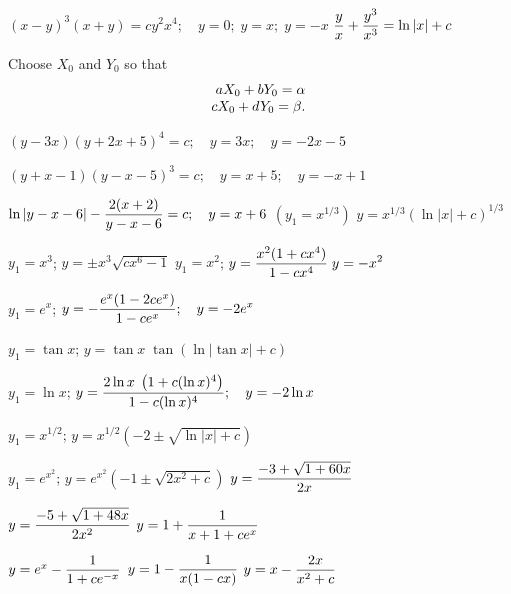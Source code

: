  $(x-y)^{3}(x+y)=cy^{2}x^{4};\quad y=0;\;y=x;\;y=-x$
$\displaystyle{\frac{y}{x}+\frac{y^{3}}{x^{3}}}=\ln|x|+c$

Choose $X_{0}$ and $Y_{0}$ so that
$$
\begin{array}[t]{@{}r@{\,}l}
aX_{0}+bY_{0}=\alpha\\
cX_{0}+dY_{0}=\beta.
\end{array}
$$

$(y-3x)(y+2x+5)^{4}=c;\quad y=3x;\quad y=-2x-5$

$(y+x-1)(y-x-5)^{3}=c;\quad y=x+5;\quad y=-x+1$

$\ln|y-x-6|-\displaystyle\frac{2(x+2)}{y-x-6}=c;\quad y=x+6$
 $(y_{1}=x^{1/3})$ $y=x^{1/3}(\ln|x|+c)^{1/3}$

 $y_{1}=x^{3}$;   $y=\pm x^{3}\sqrt{cx^{6}-1}$
 $y_{1}=x^{2}$;   $y=\displaystyle\frac{x^{2}(1+cx^{4})}{1-cx^{4}}\;
y=-x^{2}$

 $y_{1}=e^{x}$;
$y=-\displaystyle\frac{e^{x}(1-2ce^{x})}{1-ce^{x}};\quad y=-2e^{x}$

 $y_{1}=\tan x$;   $y=\tan x\;\tan(\ln|\tan x|+c)$

 $y_{1}=\ln x$;   $y=\displaystyle\frac{2\ln x\;\left(1+c(\ln
x)^{4}\right)}{1-c(\ln x)^{4}};\quad y=-2\ln x$

 $y_{1}=x^{1/2}$;
$y=x^{1/2}(-2\pm\sqrt{\ln|x|+c})$

 $y_{1}=e^{x^{2}}$;
$y=e^{x^{2}}(-1\pm\sqrt{2x^{2}+c})$
  $y=\displaystyle\frac{-3+\sqrt{1+60x}}{2x}$

  $y=\displaystyle\frac{-5+\sqrt{1+48x}}{2x^{2}}$
 $y=1+\displaystyle\frac{1}{x+1+ce^{x}}$

  $y=e^{x}-\displaystyle\frac{1}{1+ce^{-x}}$
 $y=1-\displaystyle\frac{1}{x(1-cx)}$
  $y=x-\displaystyle\frac{2x}{x^{2}+c}$

